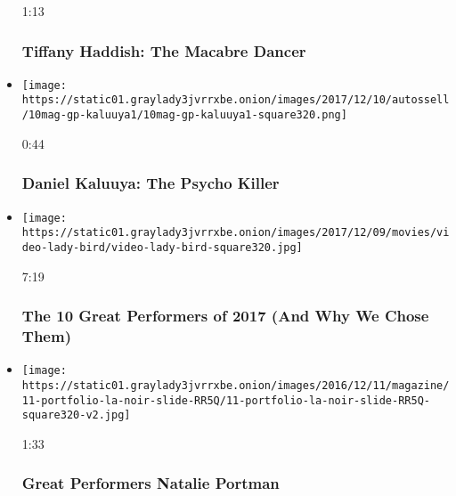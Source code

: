 \begin{itemize}
  1:13

  \hypertarget{tiffany-haddish-the-macabre-dancer}{%
  \subsubsection{Tiffany Haddish: The Macabre
  Dancer}\label{tiffany-haddish-the-macabre-dancer}}
\item
  \href{https://www.nytimes3xbfgragh.onion/video/magazine/100000005588890/daniel-kaluuya-the-psycho-killer.html?action=click\&module=video-series-bar\&region=header\&pgtype=Article\&playlistId=video/great-performers}{}

  \texttt{[image: https://static01.graylady3jvrrxbe.onion/images/2017/12/10/autossell/10mag-gp-kaluuya1/10mag-gp-kaluuya1-square320.png]}

  0:44

  \hypertarget{daniel-kaluuya-the-psycho-killer}{%
  \subsubsection{Daniel Kaluuya: The Psycho
  Killer}\label{daniel-kaluuya-the-psycho-killer}}
\item
  \href{https://www.nytimes3xbfgragh.onion/video/magazine/100000005555132/the-10-great-performers-of-2017-and-why-we-chose-them.html?action=click\&module=video-series-bar\&region=header\&pgtype=Article\&playlistId=video/great-performers}{}

  \texttt{[image: https://static01.graylady3jvrrxbe.onion/images/2017/12/09/movies/video-lady-bird/video-lady-bird-square320.jpg]}

  7:19

  \hypertarget{the-10-great-performers-of-2017-and-why-we-chose-them}{%
  \subsubsection{The 10 Great Performers of 2017 (And Why We Chose
  Them)}\label{the-10-great-performers-of-2017-and-why-we-chose-them}}
\item
  \href{https://www.nytimes3xbfgragh.onion/video/magazine/100000004793909/great-performers-natalie-portman.html?action=click\&module=video-series-bar\&region=header\&pgtype=Article\&playlistId=video/great-performers}{}

  \texttt{[image: https://static01.graylady3jvrrxbe.onion/images/2016/12/11/magazine/11-portfolio-la-noir-slide-RR5Q/11-portfolio-la-noir-slide-RR5Q-square320-v2.jpg]}

  1:33

  \hypertarget{great-performers--natalie-portman}{%
  \subsubsection{Great Performers \textbar{} Natalie
  Portman}\label{great-performers--natalie-portman}}
\end{itemize}

